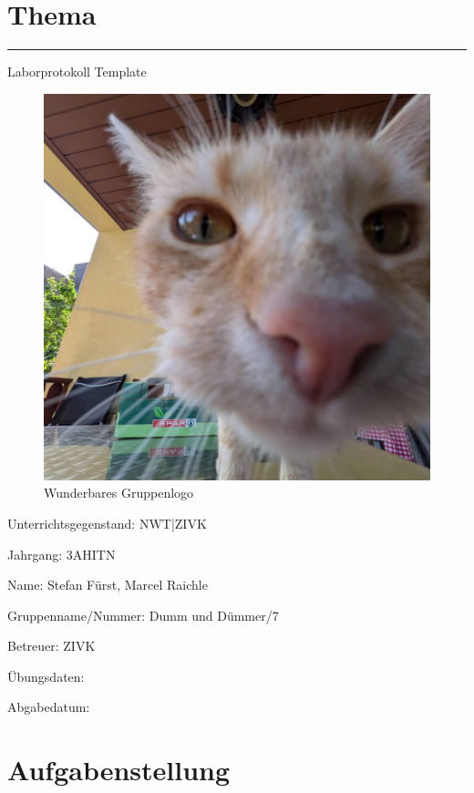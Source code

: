 \documentclass[a4paper]{article}
\begin{document}

\pagestyle{oida}
\section*{Thema}
\par\noindent\rule{\textwidth}{0.4pt}

Laborprotokoll
Template

\begin{figure}[h]
	\includegraphics[scale=0.3]{images/mika.jpeg}
	\caption{Wunderbares Gruppenlogo}
\end{figure}

\vspace*{\fill}
Unterrichtsgegenstand:	NWT|ZIVK

Jahrgang:	3AHITN

Name:	Stefan Fürst, Marcel Raichle

Gruppenname/Nummer: Dumm und Dümmer/7

Betreuer: 	ZIVK

Übungsdaten:

Abgabedatum:	


\newpage
\tableofcontents

\newpage

\section{Aufgabenstellung}
\end{document}
